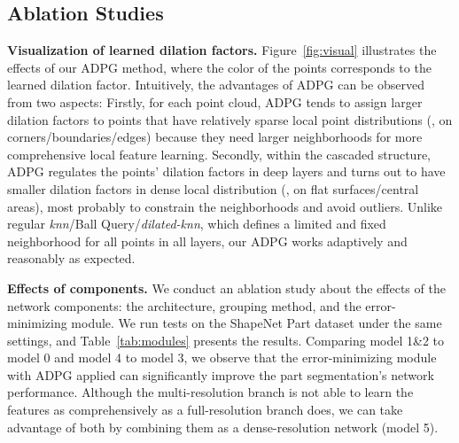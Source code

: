 \documentclass[10pt,twocolumn,letterpaper]{article}
\begin{document}
\subsection{Ablation Studies}
\label{sec:abl}
\noindent \textbf{Visualization of learned dilation factors.}   
Figure~\ref{fig:visual} illustrates the effects of our ADPG method, where the color of the points corresponds to the learned dilation factor. Intuitively, the advantages of ADPG can be observed from two aspects: Firstly, for each point cloud, ADPG tends to assign larger dilation factors to points that have relatively sparse local point distributions (\eg, on corners/boundaries/edges) because they need larger neighborhoods for more comprehensive local feature learning. Secondly, within the cascaded structure, ADPG regulates the points' dilation factors in deep layers and turns out to have smaller dilation factors in dense local distribution (\eg, on flat surfaces/central areas), most probably to constrain the neighborhoods and avoid outliers. Unlike regular \emph{knn}/Ball Query/\emph{dilated-knn}, which defines a limited and fixed neighborhood for all points in all layers, our ADPG works adaptively and reasonably as expected.

\noindent \textbf{Effects of components.}     We conduct an ablation study about the effects of the network components: the architecture, grouping method, and the error-minimizing module. We run tests on the ShapeNet Part dataset under the same settings, and Table~\ref{tab:modules} presents the results. Comparing model 1\&2 to model 0 and model 4 to model 3, we observe that the error-minimizing module with ADPG applied can significantly improve the part segmentation's network performance. Although the multi-resolution branch is not able to learn the features as comprehensively as a full-resolution branch does, we can take advantage of both by combining them as a dense-resolution network (model 5).
\end{document}
